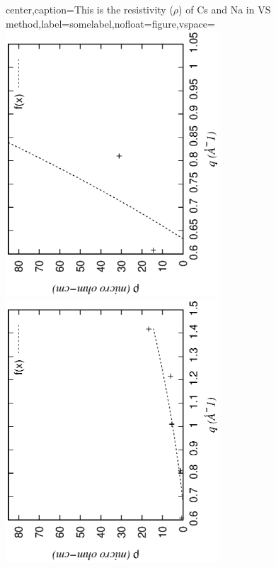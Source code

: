 \documentclass[final,12pt]{elsarticle}
\begin{document}
{\begin{adjustbox}{center,caption={This is the resistivity ($\rho$) of Cs and Na in VS method},label={somelabel},nofloat=figure,vspace=\bigskipamount}
	\includegraphics[width=0.6\textwidth,angle=-90]{irCs.eps}
	\includegraphics[width=0.6\textwidth,angle=-90]{irNa.eps}
\end{adjustbox}

}
\end{document}
